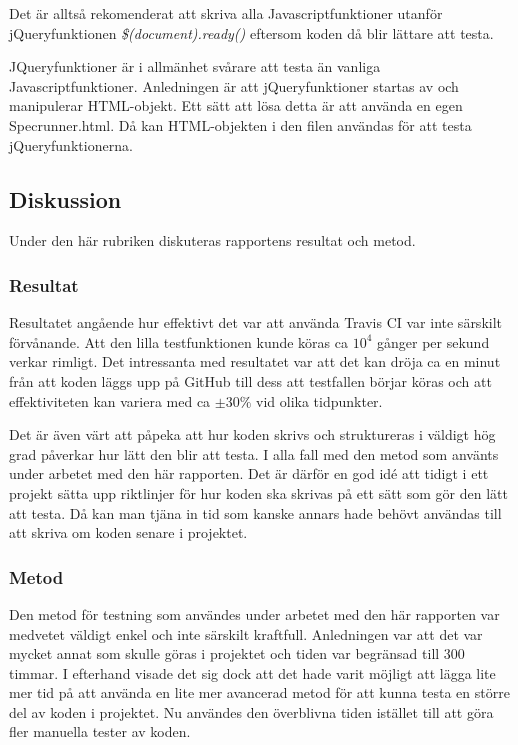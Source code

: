 Det är alltså rekomenderat att skriva alla Javascriptfunktioner utanför 
jQueryfunktionen \emph{\$(document).ready()} eftersom koden då blir 
lättare att testa.

JQueryfunktioner är i allmänhet svårare att testa än vanliga
Javascriptfunktioner. Anledningen är att jQueryfunktioner
startas av och manipulerar HTML-objekt. Ett sätt att lösa detta är
att använda en egen \textunderscore Specrunner.html. Då kan HTML-objekten i den
filen användas för att testa jQueryfunktionerna.

\subsection{Diskussion}
Under den här rubriken diskuteras rapportens resultat
och metod.

\subsubsection{Resultat}
Resultatet angående hur effektivt det var att använda Travis CI
var inte särskilt förvånande. Att den lilla testfunktionen kunde köras
ca $10^4$ gånger per sekund verkar rimligt. Det intressanta med resultatet
var att det kan dröja ca en minut från att koden läggs upp på GitHub
till dess att testfallen börjar köras och att effektiviteten
kan variera med ca $\pm 30 \%$ vid olika tidpunkter.

Det är även värt att påpeka att hur koden skrivs och struktureras
i väldigt hög grad påverkar hur lätt den blir att testa. I alla fall
med den metod som använts under arbetet med den här rapporten. Det är 
därför en god idé att tidigt i ett projekt sätta upp riktlinjer för hur
koden ska skrivas på ett sätt som gör den lätt att testa. Då kan man
tjäna in tid som kanske annars hade behövt användas till att 
skriva om koden senare i projektet.

\subsubsection{Metod}
Den metod för testning som användes under arbetet med den här rapporten var
medvetet väldigt enkel och inte särskilt kraftfull. Anledningen var
att det var mycket annat som skulle göras i projektet och tiden var
begränsad till 300 timmar. I efterhand visade det sig dock att det hade varit 
möjligt att lägga lite mer tid på att använda en lite
mer avancerad metod för att kunna testa en större
del av koden i projektet. Nu användes den överblivna tiden istället till
att göra fler manuella tester av koden.

